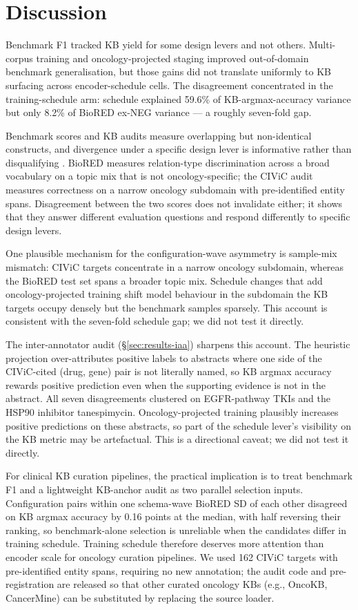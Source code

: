 \section{Discussion}
\label{sec:discussion}

Benchmark F1 tracked KB yield for some design levers and not
others. Multi-corpus training and oncology-projected staging
improved out-of-domain benchmark generalisation, but those gains
did not translate uniformly to KB surfacing across encoder-schedule
cells. The disagreement concentrated in the training-schedule arm:
schedule explained 59.6\% of KB-argmax-accuracy variance but only
8.2\% of BioRED ex-NEG variance --- a roughly seven-fold gap.

Benchmark scores and KB audits measure overlapping but
non-identical constructs, and divergence under a specific design
lever is informative rather than disqualifying
\citep{lawlor2017triangulation,liugaunt2024asq}. BioRED measures
relation-type discrimination across a broad vocabulary on a topic
mix that is not oncology-specific; the CIViC audit measures
correctness on a narrow oncology subdomain with pre-identified
entity spans. Disagreement between the two scores does not
invalidate either; it shows that they answer different evaluation
questions and respond differently to specific design levers.

One plausible mechanism for the configuration-wave asymmetry is
sample-mix mismatch: CIViC targets concentrate in a narrow oncology
subdomain, whereas the BioRED test set spans a broader topic mix. Schedule
changes that add oncology-projected training shift model behaviour
in the subdomain the KB targets occupy densely but the benchmark
samples sparsely. This account is consistent with the seven-fold
schedule gap; we did not test it directly.

The inter-annotator audit (\S\ref{sec:results-iaa}) sharpens this
account. The heuristic projection over-attributes positive labels
to abstracts where one side of the CIViC-cited (drug, gene) pair is
not literally named, so KB argmax accuracy rewards positive
prediction even when the supporting evidence is not in the
abstract. All seven disagreements clustered on EGFR-pathway TKIs
and the HSP90 inhibitor tanespimycin. Oncology-projected training
plausibly increases positive predictions on these abstracts, so
part of the schedule lever's visibility on the KB metric may be
artefactual. This is a directional caveat; we did not test it
directly.

For clinical KB curation pipelines, the practical implication is to
treat benchmark F1 and a lightweight KB-anchor audit as two
parallel selection inputs. Configuration pairs within one
schema-wave BioRED SD of each other disagreed on KB argmax accuracy
by 0.16 points at the median, with half reversing their ranking, so
benchmark-alone selection is unreliable when the candidates differ
in training schedule. Training schedule therefore deserves more
attention than encoder scale for oncology curation pipelines. We
used 162 CIViC targets with pre-identified entity spans, requiring
no new annotation; the audit code and pre-registration are released
so that other curated oncology KBs (e.g., OncoKB, CancerMine) can
be substituted by replacing the source loader.

